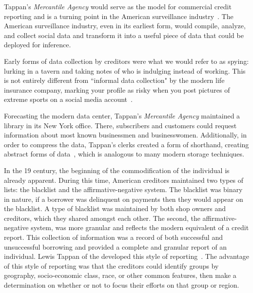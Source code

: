 Tappan's \textit{Mercantile Agency} would serve as the model for commercial
credit reporting and is a turning point in the American surveillance
industry~\cite{lauer2017creditworthy}. The American surveillance industry,
even in its earliest form, would compile, analyze, and collect social data and
transform it into a useful piece of data that could be deployed for inference.

Early forms of data collection by creditors were what we would refer to as
spying: lurking in a tavern and taking notes of who is indulging instead of
working. This is not entirely different from ``informal data collection" by the
modern life insurance company, marking your profile as risky when you post pictures
of extreme sports on a social media account~\cite{naic2012}.

Forecasting the modern data center, Tappan's \textit{Mercantile Agency}
maintained a library in its New York office. There, subscribers and customers
could request information about most known businessmen and businesswomen.
Additionally, in order to compress the data, Tappan's clerks created a form of
shorthand, creating abstract forms of data~\cite{lauer2017creditworthy}, which
is analogous to many modern storage techniques.


In the 19 century, the beginning of the commodification of the %
individual is already apparent. During this time, American creditors maintained
two types of lists: the blacklist and the affirmative-negative system. The
blacklist was binary in nature, if a borrower was delinquent on payments then
they would appear on the blacklist. A type of blacklist was maintained by both shop
owners and creditors, which they shared amongst each other. The second, the
affirmative-negative system, was more granular and reflects the modern
equivalent of a credit report. This collection of information was a record of
both successful and unsuccessful borrowing and provided a complete and granular
report of an individual. Lewis Tappan of the \mca developed this style of
reporting~\cite{lauer2017creditworthy}. The advantage of this style of
reporting was that the creditors could identify groups by geography,
socio-economic class, race, or other common features, then make a determination
on whether or not to focus their efforts on that group or region.

